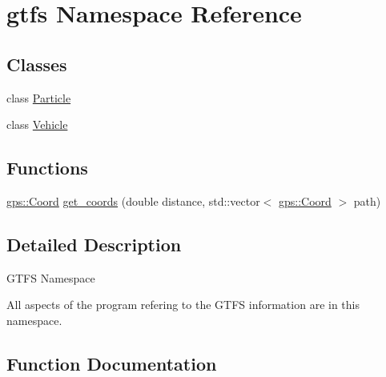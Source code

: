 \hypertarget{namespacegtfs}{}\section{gtfs Namespace Reference}
\label{namespacegtfs}
\subsection*{Classes}
\begin{DoxyCompactItemize}
\item 
class \hyperlink{classgtfs_1_1Particle}{Particle}
\item 
class \hyperlink{classgtfs_1_1Vehicle}{Vehicle}
\end{DoxyCompactItemize}
\subsection*{Functions}
\begin{DoxyCompactItemize}
\item 
\hyperlink{classgps_1_1Coord}{gps\+::\+Coord} \hyperlink{namespacegtfs_aab5513b6c15b5c30de5f706a2e587ae4}{get\+\_\+coords} (double distance, std\+::vector$<$ \hyperlink{classgps_1_1Coord}{gps\+::\+Coord} $>$ path)
\end{DoxyCompactItemize}


\subsection{Detailed Description}
G\+T\+FS Namespace

All aspects of the program refering to the G\+T\+FS information are in this namespace. 

\subsection{Function Documentation}
